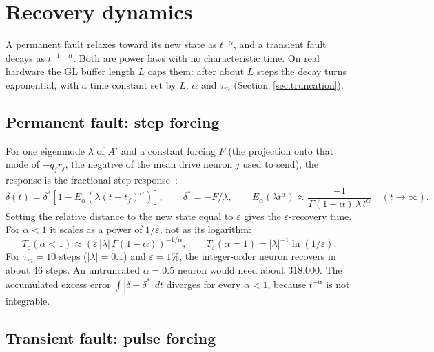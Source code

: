 \documentclass[11pt,a4paper]{article}
\begin{document}
\section{Recovery dynamics}
\label{sec:recovery}

A permanent fault relaxes toward its new state as $t^{-\alpha}$, and a transient fault decays as $t^{-1-\alpha}$. Both are power laws with no characteristic time. On real hardware the GL buffer length $L$ caps them: after about $L$ steps the decay turns exponential, with a time constant set by $L$, $\alpha$ and $\tau_m$ (Section~\ref{sec:truncation}).

\subsection{Permanent fault: step forcing}

For one eigenmode $\lambda$ of $A'$ and a constant forcing $F$ (the projection onto that mode of $-q_j r_j$, the negative of the mean drive neuron $j$ used to send), the response is the fractional step response~\cite{podlubny1999}:
\begin{equation}
\delta(t) = \delta^{*}\left[ 1 - E_{\alpha}\!\left(\lambda (t - t_f)^{\alpha}\right) \right], \qquad \delta^{*} = -F/\lambda, \qquad E_{\alpha}(\lambda t^{\alpha}) \approx \frac{-1}{\Gamma(1-\alpha)\,\lambda\, t^{\alpha}} \quad (t \to \infty).
\label{eq:step}
\end{equation}
Setting the relative distance to the new state equal to $\varepsilon$ gives the $\varepsilon$-recovery time. For $\alpha<1$ it scales as a power of $1/\varepsilon$, not as its logarithm:
\begin{equation}
T_{\varepsilon}(\alpha < 1) \approx \left( \varepsilon\, |\lambda|\, \Gamma(1-\alpha) \right)^{-1/\alpha}, \qquad T_{\varepsilon}(\alpha = 1) = |\lambda|^{-1} \ln(1/\varepsilon).
\label{eq:Teps}
\end{equation}
For $\tau_m = 10$ steps ($|\lambda| = 0.1$) and $\varepsilon = 1\%$, the integer-order neuron recovers in about 46 steps. An untruncated $\alpha = 0.5$ neuron would need about 318{,}000. The accumulated excess error $\int|\delta - \delta^*|\,dt$ diverges for every $\alpha<1$, because $t^{-\alpha}$ is not integrable.

\subsection{Transient fault: pulse forcing}
\end{document}
